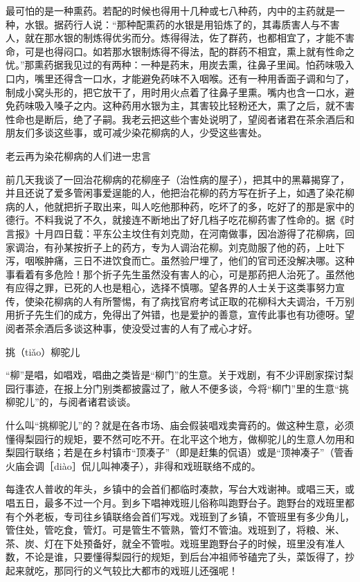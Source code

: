 \documentclass[12pt,UTF8]{ctexbook}
\begin{document}
最可怕的是一种熏药。若配的时候也得用十几种或七八种药，内中的主药就是一种，水银。据药行人说：“那种配熏药的水银是用铅炼了的，其毒质害人与不害人，就在那水银的制炼得优劣而分。炼得得法，佐了群药，也都相宜了，才能不害命，可是也得闷口。如若那水银制炼得不得法，配的群药不相宜，熏上就有性命之忧。”那熏药据我见过的有两种：一种是药末，用炭去熏，往鼻子里闻。怕药味吸入口内，嘴里还得含一口水，才能避免药味不入咽喉。还有一种用香面子调和匀了，制成小窝头形的，把它放干了，用时用火点着了往鼻子里熏。嘴内也含一口水，避免药味吸入嗓子之内。这种药用水银为主，其害较比轻粉还大，熏了之后，就不害性命也是断后，绝了子嗣。我老云把这些个害处说明了，望阅者诸君在茶余酒后和朋友们多谈这些事，或可减少染花柳病的人，少受这些害处。





老云再为染花柳病的人们进一忠言


前几天我谈了一回治花柳病的花柳座子（治性病的屋子），把其中的黑幕揭穿了，并且还说了爱多管闲事爱逞能的人，他把治花柳的药方写在折子上，如遇了染花柳病的人，他就把折子取出来，叫人吃他那种药，吃坏了的多，吃好了的那是家中的德行。不料我说了不久，就接连不断地出了好几档子吃花柳药害了性命的。据《时言报》十月四日载：平东公主坟住有刘克勋，在河南做事，因冶游得了花柳病，回家调治，有孙某按折子上的药方，专为人调治花柳。刘克勋服了他的药，上吐下泻，咽喉肿痛，三日不进饮食而亡。虽然验尸埋了，他们的官司还没解决哪。这种事看着有多危险！那个折子先生虽然没有害人的心，可是那药把人治死了。虽然他有应得之罪，已死的人也是粗心，选择不慎哪。望各界的人士关于这类事努力宣传，使染花柳病的人有所警惕，有了病找官府考试正取的花柳科大夫调治，千万别用折子先生们的成方，免得出了舛错，也是爱护的善意，宣传此事也有功德呀。望阅者茶余酒后多谈这种事，使没受过害的人有了戒心才好。





挑（tiǎo）柳驼儿


“柳”是唱，如唱戏，唱曲之类皆是“柳门”的生意。关于戏剧，有不少评剧家探讨梨园行事迹，在报上分门别类都披露过了，敝人不便多谈，今将“柳门”里的生意“挑柳驼儿”的，与阅者诸君谈谈。

什么叫“挑柳驼儿”的？就是在各市场、庙会假装唱戏卖膏药的。做这种生意，必须懂得梨园行的规矩，要不然可吃不开。在北平这个地方，做柳驼儿的生意人勿用和梨园行联络；若是在乡村镇市“顶凑子”（即是赶集的侃语）或是“顶神凑子”（管香火庙会调［diào］侃儿叫神凑子），非得和戏班联络不成的。

每逢农人普收的年头，乡镇中的会首们都临时凑款，写台大戏谢神。或唱三天，或唱五日，最多不过一个月。到乡下唱神戏班儿俗称叫跑野台子。跑野台的戏班里都有个外老板，专司往乡镇联络会首们写戏。戏班到了乡镇，不管班里有多少角儿，管住处，管吃食，管灯。可是管生不管熟，管灯不管油。戏班到了，将粮、米、茶、炭、灯在下处预备好，就全不管啦。戏班里跑野台子的时候，班里没有准人数，不论是谁，只要懂得梨园行的规矩，到后台冲祖师爷磕完了头，菜饭得了，抄起来就吃，那同行的义气较比大都市的戏班儿还强呢！
\end{document}
